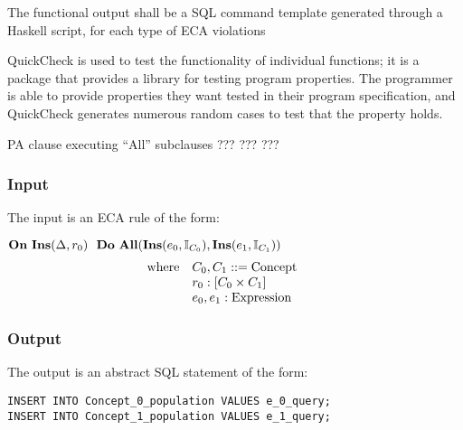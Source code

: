 \documentclass[12pt]{report}
\begin{document}
The functional output shall be a SQL command template generated through a 
Haskell script, for each type of ECA violations

QuickCheck  is used to test the functionality of individual functions; it is a 
package that provides a library for testing program properties. The programmer 
is able to provide properties they want tested in their program specification, 
and QuickCheck generates numerous random cases to test that the property 
holds\cite{hackage}. 



{PA clause executing ``All'' subclauses}  %
{???}  
{???}
{???}
\vspace{-12pt}\subsubsection*{Input}
The input is an ECA rule of the form:

$\mathbf{On~} \mathbf{Ins}(\Delta,r_0) \,\,\,\,\mathbf{Do~} \mathbf{All} ( \mathbf{Ins}(e_0,\mathbb{I}_{C_0}), \mathbf{Ins}(e_1,\mathbb{I}_{C_1}) )$
\vspace{-10pt}\[\hspace{-20pt}\begin{array}{ll}
\text{where} & C_0, C_1 ::= \text{Concept} \\ 
             & r_0 : [ C_0 \times C_1 ] \\ 
             & e_0, e_1 : \text{Expression} \\ 
\end{array}\]

\vspace{-12pt}\subsubsection*{Output}

The output is an abstract SQL statement of the form:
\begin{verbatim}
INSERT INTO Concept_0_population VALUES e_0_query;
INSERT INTO Concept_1_population VALUES e_1_query;
\end{verbatim}
\end{document}
